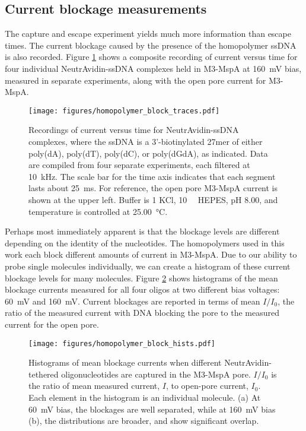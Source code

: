 \subsection{Current blockage measurements}

The capture and escape experiment yields much more information than escape times.  The current blockage caused by the presence of the homopolymer ssDNA is also recorded.  Figure \ref{fig:homopolymer_blockages} shows a composite recording of current versus time for four individual NeutrAvidin-ssDNA complexes held in M3-MspA at \SI{160}{\mV} bias, measured in separate experiments, along with the open pore current for M3-MspA.

\begin{figure}[h]
\begin{centering}
\texttt{[image: figures/homopolymer\_block\_traces.pdf]}
\caption[Current blockage traces for homopolymer ssDNA]{Recordings of current versus time for NeutrAvidin-ssDNA complexes, where the ssDNA is a 3'-biotinylated 27mer of either poly(dA), poly(dT), poly(dC), or poly(dGdA), as indicated.  Data are compiled from four separate experiments, each filtered at \SI{10}{\kHz}.  The scale bar for the time axis indicates that each segment lasts about \SI{25}{\ms}.  For reference, the open pore M3-MspA current is shown at the upper left.  Buffer is \SI{1}{\Molar} KCl, \SI{10}{\milli\Molar} HEPES, pH \num{8.00}, and temperature is controlled at \SI{25.00}{\celsius}.}
\label{fig:homopolymer_blockages}
\end{centering}
\end{figure}

Perhaps most immediately apparent is that the blockage levels are different depending on the identity of the nucleotides.  The homopolymers used in this work each block different amounts of current in M3-MspA.  Due to our ability to probe single molecules individually, we can create a histogram of these current blockage levels for many molecules.  Figure \ref{fig:homopolymer_blockage_hists} shows histograms of the mean blockage currents measured for all four oligos at two different bias voltages: \SI{60}{\mV} and \SI{160}{\mV}.  Current blockages are reported in terms of mean $I/I_0$, the ratio of the measured current with DNA blocking the pore to the measured current for the open pore.

\begin{figure}[h]
\begin{centering}
\texttt{[image: figures/homopolymer\_block\_hists.pdf]}
\caption[Current blockage histograms for homopolymer ssDNA]{Histograms of mean blockage currents when different NeutrAvidin-tethered oligonucleotides are captured in the M3-MspA pore.  $I/I_0$ is the ratio of mean measured current, $I$, to open-pore current, $I_0$.  Each element in the histogram is an individual molecule.  (a) At \SI{60}{\mV} bias, the blockages are well separated, while at \SI{160}{\mV} bias (b), the distributions are broader, and show significant overlap.}
\label{fig:homopolymer_blockage_hists}
\end{centering}
\end{figure}

